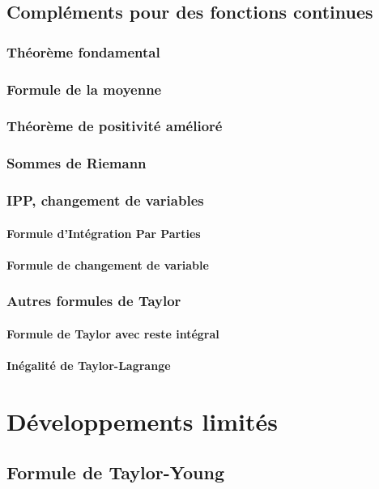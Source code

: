 \documentclass[12pt,a4paper,french]{book}
\begin{document}
	\section{Compléments pour des fonctions continues}
		\subsection{Théorème fondamental}
		\subsection{Formule de la moyenne}
		\subsection{Théorème de positivité amélioré}
		\subsection{Sommes de Riemann}
		\subsection{IPP, changement de variables}
			\subsubsection{Formule d'Intégration Par Parties}
			\subsubsection{Formule de changement de variable}
		\subsection{Autres formules de Taylor}
			\subsubsection{Formule de Taylor avec reste intégral}
			\subsubsection{Inégalité de Taylor-Lagrange}

\chapter{Développements limités}
	\section{Formule de Taylor-Young}
\end{document}
